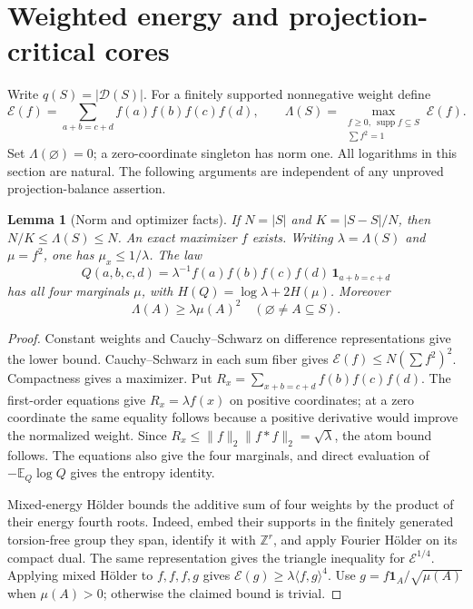 \documentclass[11pt]{amsart}
\newtheorem{lemma}[theorem]{Lemma}
\theoremstyle{definition}
\theoremstyle{remark}
\newcommand{\Z}{\mathbb{Z}}
\newcommand{\Dp}{\mathcal{D}}
\begin{document}
\section{Weighted energy and projection-critical cores}\label{sec:energy}

Write $q(S)=|\Dp(S)|$. For a finitely supported nonnegative weight define
\[
\mathcal E(f)=\sum_{a+b=c+d}f(a)f(b)f(c)f(d),\qquad
\Lambda(S)=\max_{\substack{f\ge0,\ \operatorname{supp}f\subseteq S\\\sum f^2=1}}\mathcal E(f).
\]
Set $\Lambda(\varnothing)=0$; a zero-coordinate singleton has norm one. All logarithms in this section are natural. The following arguments are independent of any unproved projection-balance assertion.

\begin{lemma}[Norm and optimizer facts]\label{lem:energy-facts}
If $N=|S|$ and $K=|S-S|/N$, then $N/K\le\Lambda(S)\le N$. An exact maximizer $f$ exists. Writing $\lambda=\Lambda(S)$ and $\mu=f^2$, one has $\mu_x\le1/\lambda$. The law
\[
Q(a,b,c,d)=\lambda^{-1}f(a)f(b)f(c)f(d)\,\mathbf1_{a+b=c+d}
\]
has all four marginals $\mu$, with $H(Q)=\log\lambda+2H(\mu)$. Moreover
\[
\Lambda(A)\ge\lambda\mu(A)^2\quad(\varnothing\ne A\subseteq S).
\]
\end{lemma}
\begin{proof}
Constant weights and Cauchy--Schwarz on difference representations give the lower bound. Cauchy--Schwarz in each sum fiber gives $\mathcal E(f)\le N(\sum f^2)^2$. Compactness gives a maximizer. Put $R_x=\sum_{x+b=c+d}f(b)f(c)f(d)$. The first-order equations give $R_x=\lambda f(x)$ on positive coordinates; at a zero coordinate the same equality follows because a positive derivative would improve the normalized weight. Since $R_x\le\|f\|_2\|f*f\|_2=\sqrt\lambda$, the atom bound follows. The equations also give the four marginals, and direct evaluation of $-\mathbb E_Q\log Q$ gives the entropy identity.

Mixed-energy H\"older bounds the additive sum of four weights by the product of their energy fourth roots. Indeed, embed their supports in the finitely generated torsion-free group they span, identify it with $\Z^r$, and apply Fourier H\"older on its compact dual. The same representation gives the triangle inequality for $\mathcal E^{1/4}$. Applying mixed H\"older to $f,f,f,g$ gives $\mathcal E(g)\ge\lambda\langle f,g\rangle^4$. Use $g=f\mathbf1_A/\sqrt{\mu(A)}$ when $\mu(A)>0$; otherwise the claimed bound is trivial.
\end{proof}
\end{document}
